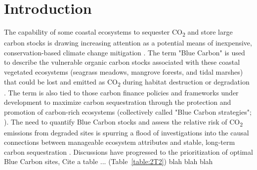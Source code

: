 \section{Introduction}

The capability of some coastal ecosystems to sequester CO\textsubscript{2} and store large carbon stocks is drawing increasing attention as a potential means of inexpensive, conservation-based climate change mitigation \citep{Hiraishi:2014uo}. The term "Blue Carbon" is used to describe the vulnerable organic carbon stocks associated with these coastal vegetated ecosystems (seagrass meadows, mangrove forests, and tidal marshes) that could be lost and emitted as CO\textsubscript{2} during habitat destruction or degradation \citep{Mcleod:2011gs}. The term is also tied to those carbon finance policies and frameworks under development to maximize carbon sequestration through the protection and promotion of carbon-rich ecosystems (collectively called "Blue Carbon strategies"; \citealt{Pendleton:2012hz}). The need to quantify Blue Carbon stocks and assess the relative risk of CO\textsubscript{2} emissions from degraded sites is spurring a flood of investigations into the causal connections between manageable ecosystem attributes and stable, long-term carbon sequestration \citep{Howard:2017jz, Macreadie:2017dt}. Discussions have progressed to the prioritization of optimal Blue Carbon sites, Cite a table ... (Table~\ref{table:2T2}) blah blah blah

